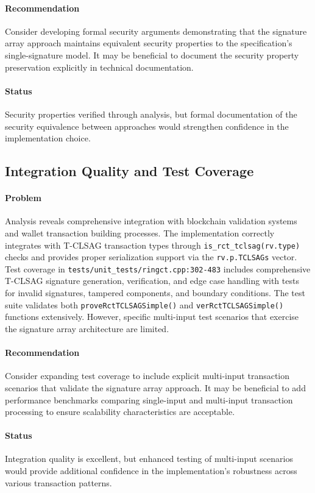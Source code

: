 \documentclass{article}
\begin{document}
\paragraph{Recommendation}
Consider developing formal security arguments demonstrating that the signature 
array approach maintains equivalent security properties to the specification's 
single-signature model.  It may be beneficial to document the security property 
preservation explicitly in technical documentation.

\paragraph{Status}
Security properties verified through analysis, but formal documentation of 
the security equivalence between approaches would strengthen confidence in 
the implementation choice.

\subsection{Integration Quality and Test Coverage}
\paragraph{Problem}
Analysis reveals comprehensive integration with blockchain validation systems 
and wallet transaction building processes.  The implementation correctly 
integrates with T-CLSAG transaction types through \texttt{is\_rct\_tclsag(rv.type)} 
checks and provides proper serialization support via the 
\texttt{rv.p.TCLSAGs} vector.  Test coverage in \texttt{tests/unit\_tests/ringct.cpp:302-483} 
includes comprehensive T-CLSAG signature generation, verification, and edge case handling 
with tests for invalid signatures, tampered components, and boundary conditions.  
The test suite validates both \texttt{proveRctTCLSAGSimple()} and \texttt{verRctTCLSAGSimple()} 
functions extensively. However, specific multi-input test scenarios that exercise 
the signature array architecture are limited.

\paragraph{Recommendation}
Consider expanding test coverage to include explicit multi-input transaction 
scenarios that validate the signature array approach.  It may be beneficial 
to add performance benchmarks comparing single-input and multi-input 
transaction processing to ensure scalability characteristics are acceptable.

\paragraph{Status}
Integration quality is excellent, but enhanced testing of multi-input 
scenarios would provide additional confidence in the implementation's 
robustness across various transaction patterns.
\end{document}
